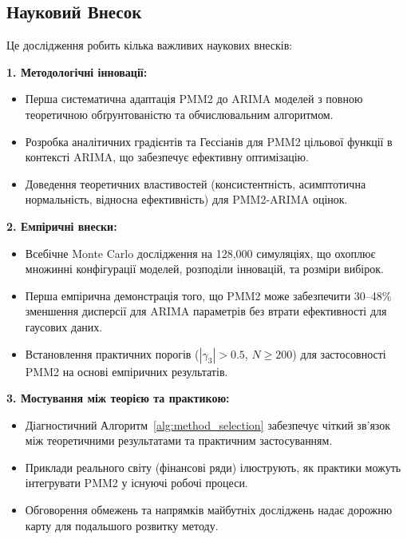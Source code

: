 \documentclass[12pt,a4paper]{article}
\begin{document}
	\subsection{Науковий Внесок}
	\label{subsec:scientific_contribution}
	
	Це дослідження робить кілька важливих наукових внесків:
	
	\textbf{1. Методологічні інновації:}
	
	\begin{itemize}
		\item Перша систематична адаптація PMM2 до ARIMA моделей з повною теоретичною обґрунтованістю та обчислювальним алгоритмом.
		
		\item Розробка аналітичних градієнтів та Гессіанів для PMM2 цільової функції в контексті ARIMA, що забезпечує ефективну оптимізацію.
		
		\item Доведення теоретичних властивостей (консистентність, асимптотична нормальність, відносна ефективність) для PMM2-ARIMA оцінок.
	\end{itemize}
	
	\textbf{2. Емпіричні внески:}
	
	\begin{itemize}
		\item Всебічне Monte Carlo дослідження на 128,000 симуляціях, що охоплює множинні конфігурації моделей, розподіли інновацій, та розміри вибірок.
		
		\item Перша емпірична демонстрація того, що PMM2 може забезпечити 30--48\% зменшення дисперсії для ARIMA параметрів без втрати ефективності для гаусових даних.
		
		\item Встановлення практичних порогів ($|\gamma_3| > 0.5$, $N \geq 200$) для застосовності PMM2 на основі емпіричних результатів.
	\end{itemize}
	
	\textbf{3. Мостування між теорією та практикою:}
	
	\begin{itemize}
		\item Діагностичний Алгоритм~\ref{alg:method_selection} забезпечує чіткий зв'язок між теоретичними результатами та практичним застосуванням.
		
		\item Приклади реального світу (фінансові ряди) ілюструють, як практики можуть інтегрувати PMM2 у існуючі робочі процеси.
		
		\item Обговорення обмежень та напрямків майбутніх досліджень надає дорожню карту для подальшого розвитку методу.
	\end{itemize}
	
\end{document}
